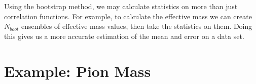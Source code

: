 \documentclass[11pt, oneside]{article}   	%
\theoremstyle{definition}
\begin{document}
Using the bootstrap method, we may calculate statistics on more than just correlation functions. For example, 
to calculate the effective mass we can create $N_{boot}$ ensembles of effective mass values, then take the 
statistics on them. Doing this gives us a more accurate estimation of the mean and error on a data set.

\section{Example: Pion Mass}
\end{document}
